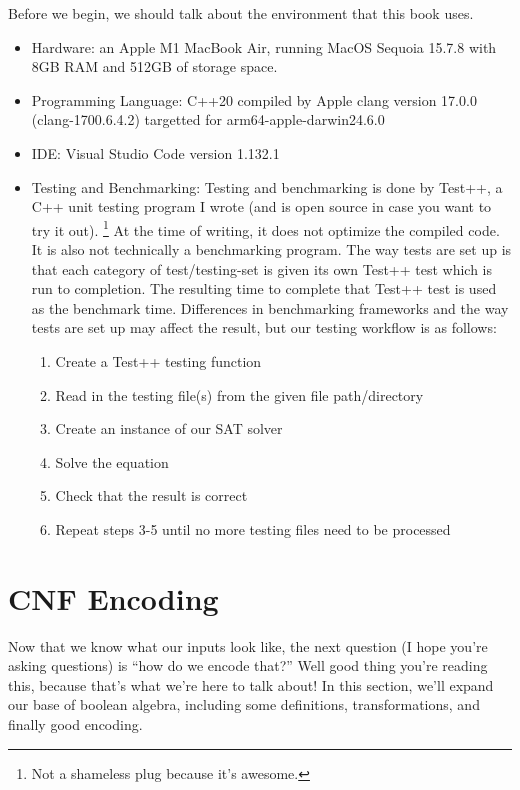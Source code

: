 \documentclass[oneside]{book}
\begin{document}
Before we begin, we should talk about the environment that this book uses. 
\begin{itemize}
    \item Hardware: an Apple M1 MacBook Air, running MacOS Sequoia  15.7.8
            with 8GB RAM and 512GB of storage space.
    \item Programming Language: C++20 compiled by Apple clang version 17.0.0 (clang-1700.6.4.2)
            targetted for arm64-apple-darwin24.6.0
    \item IDE: Visual Studio Code version 1.132.1
    \item Testing and Benchmarking: Testing and benchmarking is done by Test++, a C++ 
            unit testing program I wrote (and is open source in case you want to try it out).
            \footnote{Not a shameless plug because it's awesome.}
            At the time of writing, it does not optimize the compiled code. It is also 
            not technically a benchmarking program. The way tests are set up is that 
            each category of test/testing-set is given its own Test++ test which is run 
            to completion. The resulting time to complete that Test++ test is used as the 
            benchmark time. Differences in benchmarking frameworks and the way tests are set up 
            may affect the result, but our testing workflow is as follows:
        \begin{enumerate}
            \item Create a Test++ testing function
            \item Read in the testing file(s) from the given file path/directory
            \item Create an instance of our SAT solver
            \item Solve the equation
            \item Check that the result is correct
            \item Repeat steps 3-5 until no more testing files need to be processed
        \end{enumerate}
\end{itemize}

\section{CNF Encoding}

Now that we know what our inputs look like, the next question (I hope you're
asking questions) is ``how do we encode that?'' Well good thing you're reading
this, because that's what we're here to talk about! In this section, we'll expand
our base of boolean algebra, including some definitions, transformations, and
finally good encoding.
\end{document}
